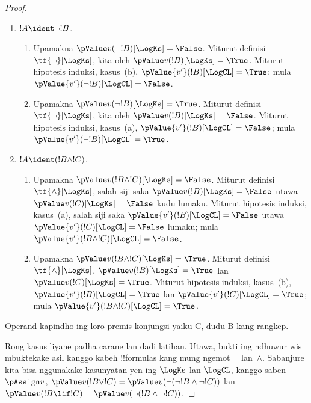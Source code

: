 \documentclass[../../../include/open-logic-section]{subfiles}
\begin{document}
\begin{proof}
\begin{enumerate}
Kanggo langkah induksi, gatekna kasus-kasus iki:
    \item $!A \ident \lnot !B$.
    \begin{enumerate}
      \item Upamakna $\pValue v(\lnot!B)[\LogKs] = \False$.
      Miturut definisi $\tf{\lnot}[\LogKs]$, kita oleh
      $\pValue v(!B)[\LogKs] = \True$. Miturut hipotesis induksi,
      kasus~(b), $\pValue {v'}(!B)[\LogCL] = \True$; mula
      $\pValue {v'}(\lnot !B)[\LogCL] = \False$.
      \item Upamakna $\pValue v(\lnot!B)[\LogKs] = \True$.
      Miturut definisi $\tf{\lnot}[\LogKs]$, kita oleh
      $\pValue v(!B)[\LogKs] = \False$. Miturut hipotesis induksi,
      kasus~(a), $\pValue {v'}(!B)[\LogCL] = \False$; mula
      $\pValue {v'}(\lnot !B)[\LogCL] = \True$.
    \end{enumerate}

\item $!A \ident (!B \land !C)$.
    \begin{enumerate}
      \item Upamakna $\pValue v(!B \land !C)[\LogKs] = \False$.
      Miturut definisi $\tf{\land}[\LogKs]$, salah siji saka
      $\pValue v(!B)[\LogKs] = \False$ utawa
      $\pValue v(!C)[\LogKs] = \False$ kudu lumaku. Miturut
      hipotesis induksi, kasus~(a), salah siji saka
      $\pValue {v'}(!B)[\LogCL] = \False$ utawa
      $\pValue {v'}(!C)[\LogCL] = \False$ lumaku; mula
      $\pValue {v'}(!B \land !C)[\LogCL] = \False$.
      \item Upamakna $\pValue v(!B \land !C)[\LogKs] = \True$.
      Miturut definisi $\tf{\land}[\LogKs]$,
      $\pValue v(!B)[\LogKs] = \True$ lan
      $\pValue v(!C)[\LogKs] = \True$. Miturut hipotesis induksi,
      kasus~(b), $\pValue {v'}(!B)[\LogCL] = \True$ lan
      $\pValue {v'}(!C)[\LogCL] = \True$; mula
      $\pValue {v'}(!B \land !C)[\LogCL] = \True$.
    \end{enumerate}
  \end{enumerate} Operand kapindho ing loro premis konjungsi yaiku C, dudu B kang rangkep.

Rong kasus liyane padha carane lan dadi latihan. Utawa,
  bukti ing ndhuwur wis mbuktekake asil kanggo kabeh !!{formula}s
  kang mung ngemot $\lnot$ lan~$\land$. Sabanjure kita bisa
  nggunakake kasunyatan yen ing $\LogKs$ lan $\LogCL$, kanggo
  saben $\pAssign v$, $\pValue v(!B \lor !C) = \pValue
  v(\lnot(\lnot!B \land \lnot !C))$ lan $\pValue v(!B \lif !C)
  = \pValue v(\lnot(!B \land \lnot !C))$.
\end{proof}
\end{document}
